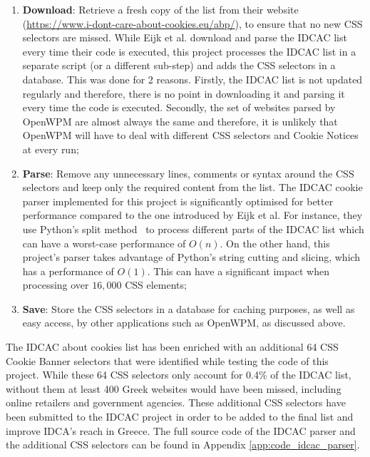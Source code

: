 \documentclass[../main.tex]{subfiles}
\begin{document}
\begin{enumerate}
    \item \textbf{Download}: Retrieve a fresh copy of the  list from their website (\url{https://www.i-dont-care-about-cookies.eu/abp/}), to ensure that no new CSS selectors are missed. While Eijk et al. download and parse the IDCAC list every time their code is executed, this project processes the IDCAC list in a separate script (or a different sub-step) and adds the CSS selectors in a database. This was done for 2 reasons. Firstly, the IDCAC list is not updated regularly and therefore, there is no point in downloading it and parsing it every time the code is executed. Secondly, the set of websites parsed by OpenWPM are almost always the same and therefore, it is unlikely that OpenWPM will have to deal with different CSS selectors and Cookie Notices at every run;
    
    \item \textbf{Parse}: Remove any unnecessary lines, comments or syntax around the CSS selectors and keep only the required content from the list. The IDCAC cookie parser implemented for this project is significantly optimised for better performance compared to the one introduced by Eijk et al. For instance, they use Python’s split method~\cite{python_str_doc} to process different parts of the IDCAC list which can have a worst-case performance of $O(n)$. On the other hand, this project’s parser takes advantage of Python’s string cutting and slicing, which has a performance of $O(1)$. This can have a significant impact when processing over $16,000$ CSS elements;
    
    \item \textbf{Save}: Store the CSS selectors in a database for caching purposes, as well as easy access, by other applications such as OpenWPM, as discussed above.
\end{enumerate}

The IDCAC about cookies list has been enriched with an additional 64 CSS Cookie Banner selectors that were identified while testing the code of this project. While these 64 CSS selectors only account for 0.4\% of the IDCAC list, without them at least 400 Greek websites would have been missed, including online retailers and government agencies. These additional CSS selectors have been submitted to the IDCAC project in order to be added to the final list and improve IDCA's reach in Greece. The full source code of the IDCAC parser and the additional CSS selectors can be found in Appendix \ref{app:code_idcac_parser}. 
\end{document}
